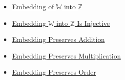 \begin{dependencies}
\begin{itemize}
  \item \hyperref[def:canonical-embedding-w-into-z]{Embedding of $\mathbb{W}$ into $\mathbb{Z}$}
  \item \hyperref[thm:embedding-w-into-z-injective]{Embedding $\mathbb{W}$ into $\mathbb{Z}$ Is Injective}
  \item \hyperref[thm:embedding-w-into-z-preserves-addition]{Embedding Preserves Addition}
  \item \hyperref[thm:embedding-w-into-z-preserves-multiplication]{Embedding Preserves Multiplication}
  \item \hyperref[thm:embedding-w-into-z-preserves-order]{Embedding Preserves Order}
\end{itemize}
\end{dependencies}
